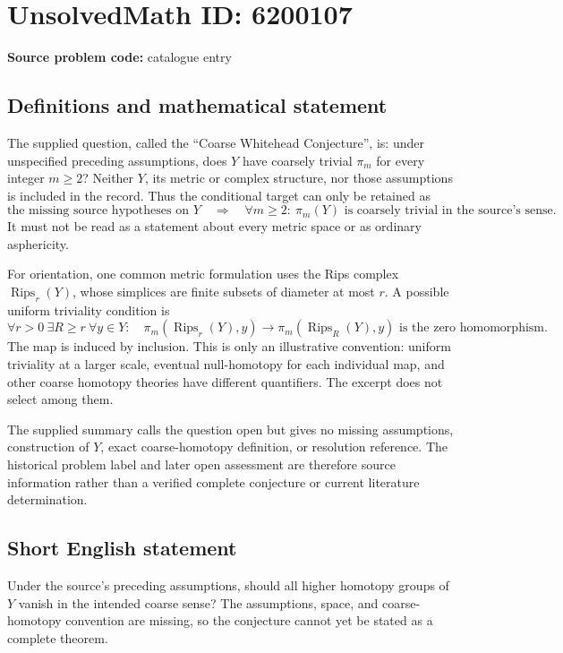 \documentclass[11pt]{article}
\begin{document}
\section*{UnsolvedMath ID: 6200107}
\textbf{Source problem code:} catalogue entry
\subsection{Definitions and mathematical statement}
The supplied question, called the ``Coarse Whitehead Conjecture'', is: under unspecified preceding assumptions, does \(Y\) have coarsely trivial \(\pi_m\) for every integer \(m\ge2\)? Neither \(Y\), its metric or complex structure, nor those assumptions is included in the record. Thus the conditional target can only be retained as
\[
 \text{the missing source hypotheses on }Y
 \quad\Longrightarrow\quad
 \forall m\ge2:\ \pi_m(Y)\text{ is coarsely trivial in the source's sense}.
\]
It must not be read as a statement about every metric space or as ordinary asphericity.

For orientation, one common metric formulation uses the Rips complex \(\operatorname{Rips}_r(Y)\), whose simplices are finite subsets of diameter at most \(r\). A possible uniform triviality condition is
\[
 \forall r>0\ \exists R\ge r\ \forall y\in Y:\quad
 \pi_m(\operatorname{Rips}_r(Y),y)\longrightarrow
 \pi_m(\operatorname{Rips}_R(Y),y)
 \text{ is the zero homomorphism}.
\]
The map is induced by inclusion. This is only an illustrative convention: uniform triviality at a larger scale, eventual null-homotopy for each individual map, and other coarse homotopy theories have different quantifiers. The excerpt does not select among them.

The supplied summary calls the question open but gives no missing assumptions, construction of \(Y\), exact coarse-homotopy definition, or resolution reference. The historical problem label and later open assessment are therefore source information rather than a verified complete conjecture or current literature determination.
\subsection{Short English statement}
Under the source's preceding assumptions, should all higher homotopy groups of \(Y\) vanish in the intended coarse sense? The assumptions, space, and coarse-homotopy convention are missing, so the conjecture cannot yet be stated as a complete theorem.
\end{document}
